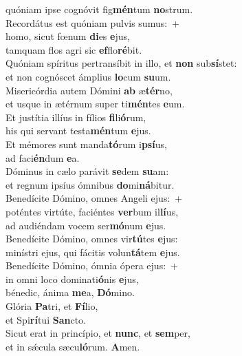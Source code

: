 \oddverse quóniam ipse cognóvit fig\textbf{mén}tum \textbf{no}strum.\\
\evenverse Recordátus est quóniam pulvis sumus:~+\\
\evenverse  homo, sicut fœnum \textbf{di}es \textbf{e}jus,~\*\\
\evenverse tamquam flos agri sic \textbf{ef}flo\textbf{ré}bit.\\
\oddverse Quóniam spíritus pertransíbit in illo, et \textbf{non} sub\textbf{sí}stet:~\*\\
\oddverse et non cognóscet ámplius \textbf{lo}cum \textbf{su}um.\\
\evenverse Misericórdia autem Dómini \textbf{ab} æ\textbf{tér}no,~\*\\
\evenverse et usque in ætérnum super ti\textbf{mén}tes \textbf{e}um.\\
\oddverse Et justítia illíus in fílios \textbf{fi}li\textbf{ó}rum,~\*\\
\oddverse his qui servant testa\textbf{mén}tum \textbf{e}jus.\\
\evenverse Et mémores sunt manda\textbf{tó}rum i\textbf{psí}us,~\*\\
\evenverse ad faci\textbf{én}dum \textbf{e}a.\\
\oddverse Dóminus in cælo parávit \textbf{se}dem \textbf{su}am:~\*\\
\oddverse et regnum ipsíus ómnibus \textbf{do}mi\textbf{ná}bitur.\\
\evenverse Benedícite Dómino, omnes Angeli ejus:~+\\
\evenverse  poténtes virtúte, faciéntes \textbf{ver}bum il\textbf{lí}us,~\*\\
\evenverse ad audiéndam vocem ser\textbf{mó}num \textbf{e}jus.\\
\oddverse Benedícite Dómino, omnes vir\textbf{tú}tes \textbf{e}jus:~\*\\
\oddverse minístri ejus, qui fácitis volun\textbf{tá}tem \textbf{e}jus.\\
\evenverse Benedícite Dómino, ómnia ópera ejus:~+\\
\evenverse  in omni loco dominati\textbf{ó}nis \textbf{e}jus,~\*\\
\evenverse bénedic, ánima \textbf{me}a, \textbf{Dó}mino.\\
\oddverse Glória \textbf{Pa}tri, et \textbf{Fí}lio,~\*\\
\oddverse et Spi\textbf{rí}tui \textbf{San}cto.\\
\evenverse Sicut erat in princípio, et \textbf{nunc}, et \textbf{sem}per,~\*\\
\evenverse et in sǽcula sæcu\textbf{ló}rum. \textbf{A}men.\\
